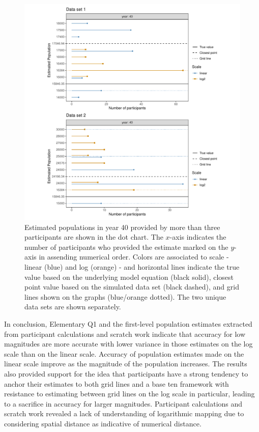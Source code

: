 \documentclass[print]{nuthesis}
\begin{document}
\begin{figure}[tbp]

{\centering \includegraphics[width=1\linewidth,]{thesis_files/figure-latex/common-population-estimates-1} 

}

\caption[Estimated population: common responses for year 40]{Estimated populations in year 40 provided by more than three participants are shown in the dot chart. The $x$-axis indicates the number of participants who provided the estimate marked on the $y$-axis in assending numerical order. Colors are associated to scale - linear (blue) and log (orange) - and horizontal lines indicate the true value based on the underlying model equation (black solid), closest point value based on the simulated data set (black dashed), and grid lines shown on the graphs (blue/orange dotted). The two unique data sets are shown separately.}\label{fig:common-population-estimates}
\end{figure}

In conclusion, Elementary Q1 and the first-level population estimates extracted from participant calculations and scratch work indicate that accuracy for low magnitudes are more accurate with lower variance in those estimates on the log scale than on the linear scale.
Accuracy of population estimates made on the linear scale improve as the magnitude of the population increases.
The results also provided support for the idea that participants have a strong tendency to anchor their estimates to both grid lines and a base ten framework with resistance to estimating between grid lines on the log scale in particular, leading to a sacrifice in accuracy for larger magnitudes.
Participant calculations and scratch work revealed a lack of understanding of logarithmic mapping due to considering spatial distance as indicative of numerical distance.
\end{document}
